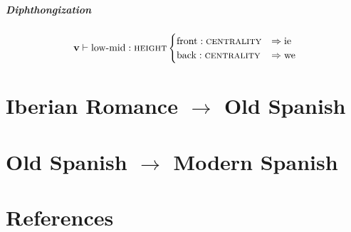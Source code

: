 \documentclass{report}
\begin{document}
\paragraph{Diphthongization}

\[
  \textbf{v} \vdash \text{low-mid} : \textsc{height}
  \begin{cases}
    \text{front} : \textsc{centrality} & \Rightarrow \text{ie} \\
    \text{back} : \textsc{centrality} & \Rightarrow \text{we} \\
  \end{cases}
\]

\chapter{Iberian Romance $\rightarrow$ Old Spanish}

\chapter{Old Spanish $\rightarrow$ Modern Spanish}

\chapter{References}
\end{document}
